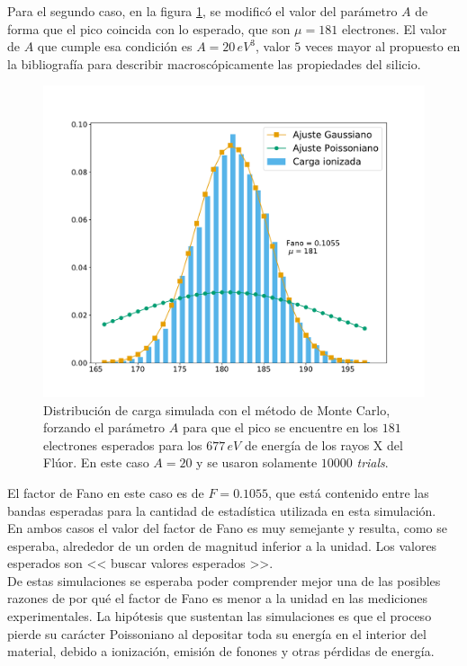 \noindent Para el segundo caso, en la figura \ref{fig:Simulacion1rden1Fano2}, se modificó el valor del parámetro $A$ de forma que el pico coincida con lo esperado, que son $\mu = 181$ electrones. El valor de $A$ que cumple esa condición es $A = 20\,\si{eV}^{3}$, valor $5$ veces mayor al propuesto en la bibliografía para describir macroscópicamente las propiedades del silicio.
\begin{figure}%
    \centering
    \includegraphics[scale=0.35]{Figs/Fano_677_Eloss0_10ktrials.pdf}
    \caption{\footnotesize{Distribución de carga simulada con el método de Monte Carlo, forzando el parámetro $A$ para que el pico se encuentre en los $181$ electrones esperados para los $677\,\si{eV}$ de energía de los rayos X del Flúor. En este caso $A=20$ y se usaron solamente $10000$ \textit{trials}.}}
    \label{fig:Simulacion1rden1Fano2}
\end{figure}
El factor de Fano en este caso es de $F = 0.1055$, que está contenido entre las bandas esperadas para la cantidad de estadística utilizada en esta simulación.\\%
\indent En ambos casos el valor del factor de Fano es muy semejante y resulta, como se esperaba, alrededor de un orden de magnitud inferior a la unidad. Los valores esperados son << buscar valores esperados >>.\\
\indent De estas simulaciones se esperaba poder comprender mejor una de las posibles razones de por qué el factor de Fano es menor a la unidad en las mediciones experimentales. La hipótesis que sustentan las simulaciones es que el proceso pierde su carácter Poissoniano al depositar toda su energía en el interior del material, debido a ionización, emisión de fonones y otras pérdidas de energía.

